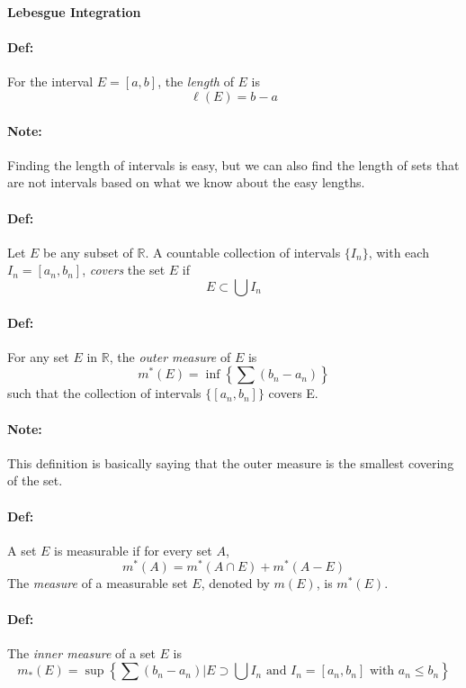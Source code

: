 \documentclass[10pt,a4paper]{article}
\begin{document}
\begin{center}
\textbf{Lebesgue Integration}
\end{center}

\paragraph{Def:} For the interval $E = [a,b]$, the \textit{length} of $E$ is 
$$ \ell(E) = b-a$$

\paragraph{Note:} Finding the length of intervals is easy, but we can also find the length of sets that are not intervals based on what we know about the easy lengths.

\paragraph{Def:} Let $E$ be any subset of $\mathbb{R}$. A countable collection of intervals $\{ I_n \}$, with each $I_n = [a_n, b_n]$, \textit{covers} the set $E$ if
$$ E \subset \bigcup I_n$$

\paragraph{Def:} For any set $E$ in $\mathbb{R}$, the \textit{outer measure} of $E$ is 
$$ m^*(E) = \inf\left \{ \sum (b_n-a_n)\right \}$$
such that the collection of intervals $\{ [a_n, b_n]\}$ covers E.

\paragraph{Note:} This definition is basically saying that the outer measure is the smallest covering of the set.

\paragraph{Def:} A set $E$ is measurable if for every set $A$,
$$ m^*(A) = m^*(A \cap E) + m^*(A-E)$$
The \textit{measure} of a measurable set $E$, denoted by $m(E)$, is $m^*(E)$.

\paragraph{Def:} The \textit{inner measure} of a set $E$ is
$$ m_*(E) = \sup \left \{ \sum (b_n-a_n) | E \supset \bigcup I_n \text{ and } I_n = [a_n,b_n] \text{ with } a_n \leq b_n \right \}$$
\end{document}

